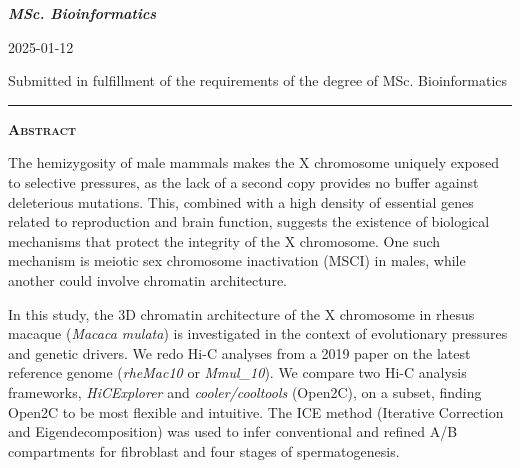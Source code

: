\documentclass[
  11pt,
  a4paper,
]{scrbook}
\let\oldemph\emph
\renewcommand\emph[1]{\oldemph{\color{gray}#1}}
\begin{document}
{{\bfseries\Large\textit{MSc. Bioinformatics} \par}
\vspace{3ex}

{\large 2025-01-12 \par}
\vspace{3ex}

\vspace{10ex}
{\small Submitted in fulfillment of the requirements
of the degree of MSc. Bioinformatics \par}
\pagebreak


\vspace*{\fill} %
\noindent
\begin{minipage}{.8\textwidth}
    \centering
    \hspace*{\fill}\rule{0.5\textwidth}{0.4pt}\hspace*{\fill} %
    \par \vspace{2em} %
    {\Large\bfseries\scshape Abstract} %
    \par %
    \vspace{1em} %
    \justifying %
    The hemizygosity of male mammals makes the X chromosome uniquely
exposed to selective pressures, as the lack of a second copy provides no
buffer against deleterious mutations. This, combined with a high density
of essential genes related to reproduction and brain function, suggests
the existence of biological mechanisms that protect the integrity of the
X chromosome. One such mechanism is meiotic sex chromosome inactivation
(MSCI) in males, while another could involve chromatin architecture.

In this study, the 3D chromatin architecture of the X chromosome in
rhesus macaque (\emph{Macaca mulata}) is investigated in the context of
evolutionary pressures and genetic drivers. We redo Hi-C analyses from a
2019 paper on the latest reference genome (\emph{rheMac10} or
\emph{Mmul\_10}). We compare two Hi-C analysis frameworks,
\emph{HiCExplorer} and \emph{cooler/cooltools} (Open2C), on a subset,
finding Open2C to be most flexible and intuitive. The ICE method
(Iterative Correction and Eigendecomposition) was used to infer
conventional and refined A/B compartments for fibroblast and four stages
of spermatogenesis.


\end{minipage}}
\end{document}
